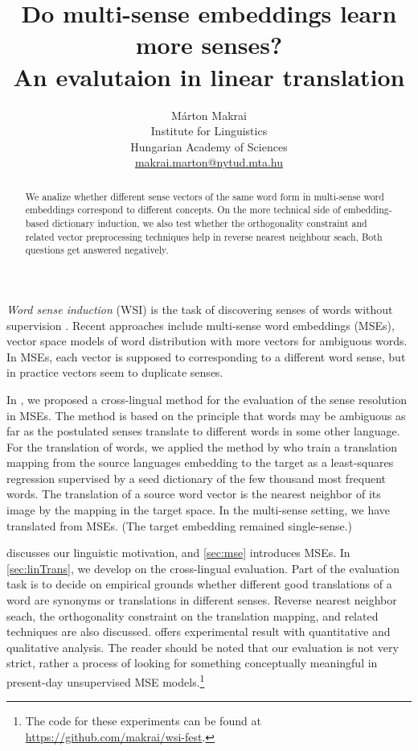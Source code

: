 \documentclass[11pt]{article}
\title{Do multi-sense embeddings learn more senses? \\ An evalutaion in linear
translation}
\author{
  Márton Makrai
  \\ Institute for Linguistics\\
  Hungarian Academy of Sciences \\
  \href{mailto:makrai.hlt@gmail.com}{makrai.marton@nytud.mta.hu} \\
}
\date{}
\begin{document}
\maketitle


\begin{abstract}
  We analize whether different sense vectors of the same word form in
  multi-sense word embeddings correspond to different concepts. On the more
  technical side of embedding-based dictionary induction, we also test whether
  the orthogonality constraint and related vector preprocessing techniques help
  in reverse nearest neighbour seach, Both questions get answered negatively.
\end{abstract}


\emph{Word sense induction} (WSI) is the task of discovering senses of words
without supervision \citep{Schutze:1998}. Recent approaches include multi-sense
word embeddings (MSEs), vector space models of word distribution with more
vectors for ambiguous words. In MSEs, each vector is supposed to corresponding
to a different word sense, but in practice vectors seem to duplicate senses.

In \cite{Borbely:2016}, we proposed a cross-lingual method for the evaluation
of the sense resolution in MSEs. The method is based on the principle that
words may be ambiguous as far as the postulated senses translate to different
words in some other language.  For the translation of words, we applied the
method by \citet{Mikolov:2013x} who train a translation mapping from the source
languages embedding to the target as a least-squares regression supervised by a
seed dictionary of the few thousand most frequent words. The translation of a
source word vector is the nearest neighbor of its image by the mapping in the
target space. In the multi-sense setting, we have translated from MSEs. (The
target embedding remained single-sense.)

 discusses our linguistic motivation, and \cref{sec:mse}
introduces MSEs.  In \cref{sec:linTrans}, we develop on the cross-lingual
evaluation. Part of the evaluation task is to decide on empirical grounds
whether different good translations of a word are synonyms or translations in
different senses.  Reverse nearest neighbor seach, the orthogonality constraint
on the translation mapping, and related techniques are also discussed.
 offers experimental result with quantitative and qualitative
analysis.  The reader should be noted that our evaluation is not very strict,
rather a process of looking for something conceptually meaningful in
present-day unsupervised MSE models.\footnote{The code for these experiments
can be found at \url{https://github.com/makrai/wsi-fest}.}
\end{document}
